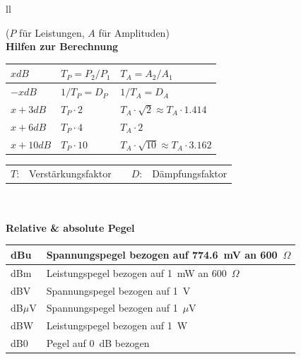 \begin{tabular}{ll}
{\small{($P$ für Leistungen, $A$ für Amplituden)}
\\ 

\textbf{Hilfen zur Berechnung}\\
\begin{tabular}{|l|ll|}
\hline
$x dB$	& $T_P=P_2/P_1$ &$T_A=A_2/A_1$ \\
\hline
$-x dB$	& $1/T_P = D_P$	& $1/T_A = D_A$\\
$x+3dB$	& $T_P \cdot 2$	& $T_A \cdot \sqrt{2} \approx T_A \cdot 1.414$ \\
$x+6dB$ & $T_P \cdot 4$ & $T_A \cdot 2$ \\
$x+10dB$	& $T_P \cdot 10$ & $T_A \cdot \sqrt{10} \approx T_A \cdot 3.162$\\
\hline
\end{tabular}
\begin{tabular}{lllll}
  $T$: & Verstärkungsfaktor & &
  $D$: & Dämpfungsfaktor
\end{tabular}
\\ \\

\textbf{Relative \& absolute Pegel}\\
\begin{tabular}{|l|l|}
  \hline
    dBu & Spannungspegel bezogen auf 774.6~mV an 600~$\Omega$\\
  \hline
    dBm & Leistungspegel bezogen auf 1~mW an 600~$\Omega$\\
  \hline
  \hline
    dBV & Spannungspegel bezogen auf 1~V\\
  \hline
    dB$\mu$V & Spannungspegel bezogen auf 1~$\mu$V\\
  \hline
    dBW & Leistungspegel bezogen auf 1~W\\
  \hline
    dB0 & Pegel auf 0~dB bezogen\\
  \hline
\end{tabular}

}
\end{tabular}
\newpage

